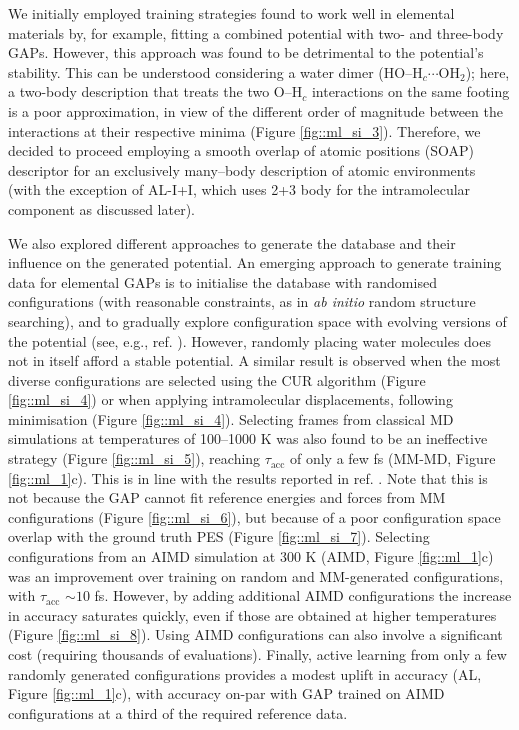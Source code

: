 \documentclass[../../main.tex]{subfiles}
\newcommand{\taua}{$\tau_\text{acc}$ }
\begin{document}
We initially employed training strategies found to work well in elemental materials by, for example, fitting a combined potential with two- and three-body GAPs. However, this approach was found to be detrimental to the potential’s stability. This can be understood considering a water dimer (HO–H${}_c \cdots$OH${}_2$); here, a two-body description that treats the two O–H${}_c$ interactions on the same footing is a poor approximation, in view of the different order of magnitude between the interactions at their respective minima (Figure \ref{fig::ml_si_3}). Therefore, we decided to proceed employing a smooth overlap of atomic positions\cite{Bartok2013} (SOAP) descriptor for an exclusively many–body description of atomic environments (with the exception of AL-I+I, which uses 2+3 body for the intramolecular component as discussed later). 

We also explored different approaches to generate the database and their influence on the generated potential. An emerging approach to generate training data for elemental GAPs is to initialise the database with randomised configurations (with reasonable constraints, as in \emph{ab initio} random structure searching\cite{Pickard2011}), and to gradually explore configuration space with evolving versions of the potential (see, e.g., ref. \cite{Bernstein2019}). However, randomly placing water molecules does not in itself afford a stable potential. A similar result is observed when the most diverse configurations are selected using the CUR algorithm\cite{Mahoney2009, Bernstein2019} (Figure \ref{fig::ml_si_4}) or when applying intramolecular displacements, following minimisation (Figure \ref{fig::ml_si_4}). Selecting frames from classical MD simulations at temperatures of 100–1000 K was also found to be an ineffective strategy (Figure \ref{fig::ml_si_5}), reaching \taua of only a few fs (MM-MD, Figure \ref{fig::ml_1}c). This is in line with the results reported in ref. \cite{Cole2020}. Note that this is not because the GAP cannot fit reference energies and forces from MM configurations (Figure \ref{fig::ml_si_6}), but because of a poor configuration space overlap with the ground truth PES (Figure \ref{fig::ml_si_7}). Selecting configurations from an AIMD simulation at 300 K (AIMD, Figure \ref{fig::ml_1}c) was an improvement over training on random and MM-generated configurations, with \taua $\sim10$ fs. However, by adding additional AIMD configurations the increase in accuracy saturates quickly, even if those are obtained at higher temperatures (Figure \ref{fig::ml_si_8}). Using AIMD configurations can also involve a significant cost (requiring thousands of evaluations). Finally, active learning from only a few randomly generated configurations provides a modest uplift in accuracy (AL, Figure \ref{fig::ml_1}c), with accuracy on-par with GAP trained on AIMD configurations at a third of the required reference data.
\end{document}

